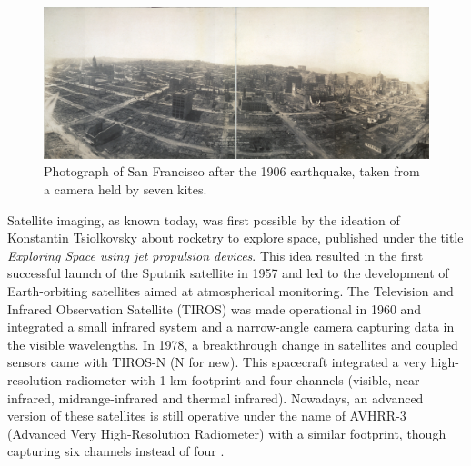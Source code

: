\begin{figure}[!ht]
	\includegraphics{figs/introduction/san_francisco_kitecamera.jpg}
	\caption{Photograph of San Francisco after the 1906 earthquake, taken from a camera held by seven kites. }
    \label{fig:san_francisco_kite}
\end{figure}

Satellite imaging, as known today, was first possible by the ideation of Konstantin Tsiolkovsky about rocketry to explore space, published under the title \textit{Exploring Space using jet propulsion devices}. This idea resulted in the first successful launch of the Sputnik satellite in 1957 and led to the development of Earth-orbiting satellites aimed at atmospherical monitoring. The Television and Infrared Observation Satellite (TIROS) was made operational in 1960 and integrated a small infrared system and a narrow-angle camera capturing data in the visible wavelengths. In 1978, a breakthrough change in satellites and coupled sensors came with TIROS-N (N for new). This spacecraft integrated a very high-resolution radiometer with 1 \si{\kilo\meter} footprint and four channels (visible, near-infrared, midrange-infrared and thermal infrared). Nowadays, an advanced version of these satellites is still operative under the name of AVHRR-3 (Advanced Very High-Resolution Radiometer) with a similar footprint, though capturing six channels instead of four \cite{national_oceanic_and_atmospheric_administration_avhrr3_nodate}.   

